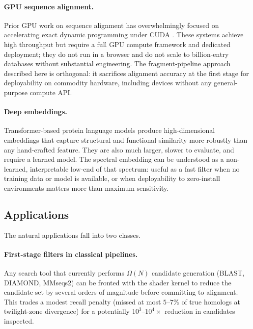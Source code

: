 \documentclass[twocolumn,11pt,a4paper]{article}
\theoremstyle{definition}
\theoremstyle{remark}
\begin{document}
\paragraph{GPU sequence alignment.} Prior GPU work on sequence alignment
has overwhelmingly focused on accelerating exact dynamic programming under
CUDA \citep{liu2013cudasw,manavski2008,rognes2011}. These systems achieve
high throughput but require a full GPU compute framework and dedicated
deployment; they do not run in a browser and do not scale to billion-entry
databases without substantial engineering. The fragment-pipeline approach
described here is orthogonal: it sacrifices alignment accuracy at the
first stage for deployability on commodity hardware, including devices
without any general-purpose compute API.

\paragraph{Deep embeddings.} Transformer-based protein language models
\citep{bepler2019,rives2021,elnaggar2022} produce high-dimensional
embeddings that capture structural and functional similarity more robustly
than any hand-crafted feature. They are also much larger, slower to
evaluate, and require a learned model. The spectral embedding can be
understood as a non-learned, interpretable low-end of that spectrum:
useful as a fast filter when no training data or model is available, or
when deployability to zero-install environments matters more than maximum
sensitivity.

\subsection{Applications}
\label{sec:apps}

The natural applications fall into two classes.

\paragraph{First-stage filters in classical pipelines.} Any search tool
that currently performs $\Omega(N)$ candidate generation (BLAST, DIAMOND,
MMseqs2) can be fronted with the shader kernel to reduce the candidate
set by several orders of magnitude before committing to alignment. This
trades a modest recall penalty (missed at most $5$--$7\%$ of true homologs
at twilight-zone divergence) for a potentially $10^3$--$10^4\times$
reduction in candidates inspected.
\end{document}
